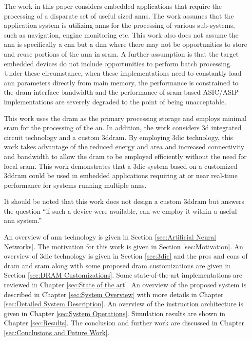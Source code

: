 The work in this paper considers embedded applications that require the processing of a disparate set of useful sized \ac{ann}s. The work assumes that the application system is utilizing \ac{ann}s
for the processing of various sub-systems, such as navigation, engine monitoring etc. This work also does not assume the \ac{ann} is specifically a \ac{cnn} but a \ac{dnn} where there may
not be opportunities to store and reuse portions of the \ac{ann} in \ac{sram}. A further assumption is that the target embedded devices do not include opportunities to perform batch processing.
Under these circumstance, when these implementations need to constantly load \ac{ann} parameters directly from main memory, the performance is constrained to the \ac{dram} interface bandwidth and the performance of \ac{sram}-based ASIC/ASIP implementations are severely degraded to the point of being unacceptable.

This work uses the \ac{dram} as the primary processing storage and employs minimal \ac{sram} for the processing of the \ac{an}.
In addition, the work considers \ac{3d} integrated circuit technology and a custom \ac{3ddram}. By employing \ac{3dic} technology, this work takes advantage of the reduced energy and area and increased
connectivity and bandwidth to allow the \ac{dram} to be employed efficiently without the need for local \ac{sram}.
This work demonstrates that a \ac{3dic} system based on a customized \ac{3ddram} could be used in embedded applications requiring at or near real-time performance for systems running multiple \ac{ann}s.

It should be noted that this work does not design a custom \ac{3ddram} but answers the question ``if such a device were available, can we employ it within a useful \ac{ann} system.''

\hfill %

An overview of \ac{ann} technology is given in Section \ref{sec:Artificial Neural Networks}.
The motivation for this work is given in Section \ref{sec:Motivation}.
An overview of \ac{3dic} technology is given in Section \ref{sec:3dic} and the pros and cons of \ac{dram} and \ac{sram} along with some proposed \ac{dram} customizations are given in Section \ref{sec:DRAM Customizations}.
Some state-of-the-art implementations are reviewed in Chapter \ref{sec:State of the art}.
An overview of the proposed system is described in Chapter \ref{sec:System Overview} with more details in Chapter \ref{sec:Detailed System Description}.
An overview of the instruction architecture is given in Chapter \ref{sec:System Operations}.
Simulation results are shown in Chapter \ref{sec:Results}.
The conclusion and further work are discussed in Chapter \ref{sec:Conclusions and Future Work}.


